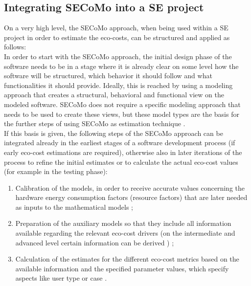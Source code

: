 \documentclass[oribibl]{llncs}
\begin{document}
\subsection{Integrating SECoMo into a SE project}
On a very high level, the SECoMo approach, when being used within a SE project in order to estimate the eco-costs, can be structured and applied as follows:\\
In order to start with the SECoMo approach, the initial design phase of the software needs to be in a stage where it is already clear on some level how the software will be structured, which behavior it should follow and what functionalities it should provide. %
Ideally, this is reached by using a modeling approach that creates a structural, behavioral and functional view on the modeled software. SECoMo does not require a specific modeling approach that needs to be used to create these views, but these model types are the basis for the further steps of using SECoMo as estimation technique \cite{schulze_cost_2016}.\\
If this basis is given, the following steps of the SECoMo approach can be integrated already in the earliest stages of a software development process (if early eco-cost estimations are required), otherwise also in later iterations of the process to refine the initial estimates or to calculate the actual eco-cost values (for example in the testing phase):
\begin{enumerate}
	\item Calibration of the models, in order to receive accurate values concerning the hardware energy consumption factors (resource factors) that are later needed as inputs to the mathematical models \cite{schulze_cost_2016}; %
	\item Preparation of the auxiliary models so that they include all information available regarding the relevant eco-cost drivers (on the intermediate and advanced level certain information can be derived%
	) \cite{schulze_cost_2016}; %
	\item Calculation of the estimates for the different eco-cost metrics based on the available information %
	and the specified parameter values, which specify aspects like user type or case \cite{schulze_cost_2016}.
\end{enumerate}
\end{document}
